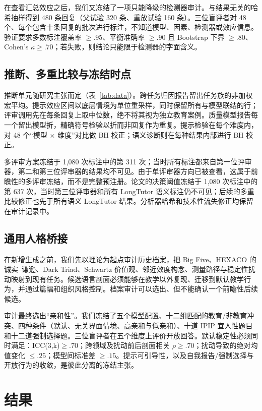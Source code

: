 \documentclass[11pt,a4paper,UTF8]{ctexart}
\begin{document}
在查看汇总效应之后，我们又冻结了一项只能降级的检测器审计。与结果无关的哈希抽样得到 480 条回复（父试验 320 条、重放试验 160 条）。三位盲评者对 48 个、每个包含十条回复的批次进行标注，不知道模型、因素、检测器或效应信息。验证要求多数标注覆盖率 $\geq .95$、平衡准确率 $\geq .90$ 且 Bootstrap 下界 $\geq .80$、Cohen's $\kappa\geq .70$；若失败，则结论只能限于检测器的字面含义。

\subsection{推断、多重比较与冻结时点}

推断单元随研究主张而定（表~\ref{tab:data}）。跨任务归因报告留出任务族的非加权宏平均。提示效应区间以底层情境为单位重采样，同时保留所有与模型联结的行；评审调用先在每条回复上取中位数，绝不将其视为独立教育案例。质量模型报告每一个留出模型折，精确符号检验以折而非回复作为重复。提示检验在每个难度内，对 48 个“模型 $\times$ 维度”对比做 BH 校正；语义诊断则在每种结果内部进行 BH 校正。

多评审方案冻结于 1,080 次标注中的第 311 次；当时所有标注都来自第一位评审器，第二和第三位评审器的结果均不可见。由于单评审器方向已被查看，这属于前瞻性的多评审冻结，而不是完整预注册。论文的决策阈值冻结于 1,080 次标注中的第 637 次，当时第三位评审器和所有 LongTutor 语义标注仍不可见；后续的多重比较修正也先于所有语义 LongTutor 结果。分析器哈希和技术性流失修正均保留在审计记录中。

\subsection{通用人格桥接}

在新增生成之前，我们先以理论为起点审计历史档案，把 Big Five、HEXACO 的诚实--谦逊、Dark Triad、Schwartz 价值观、邻近效度构念、测量路径与稳定性扰动映射到现有任务。候选语言剖面必须能够在教学以外复现、迁移到默认教学行为，并通过篇幅和组织风格控制。档案审计可以选出、但不能确认一个前瞻性后续候选。

审计最终选出“亲和性”。我们冻结了五个模型配置、十二组匹配的教育/非教育冲突、四种条件（默认、无关界面情境、高亲和与低亲和）、十道 IPIP 宜人性题目和十二道强制选择题。三位盲评者在五个维度上评价开放回答。默认稳定性必须同时满足：ICC(3,k)$\geq .70$；跨领域及扰动前后剖面相关 $\rho\geq .70$；扰动导致的绝对均值变化 $\leq .25$；模型间标准差 $\geq .15$。提示可引导性，以及自我报告/强制选择与开放行为的收敛，是彼此分离的冻结主张。

\section{结果}
\end{document}
